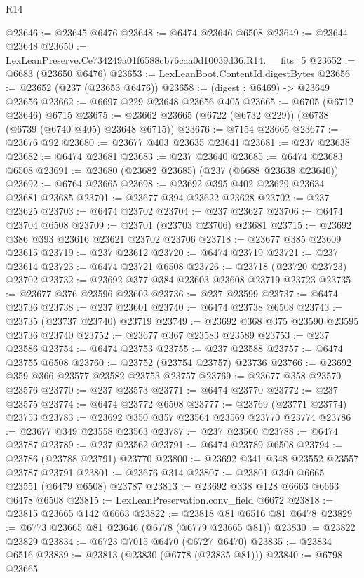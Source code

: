 \begin{lexlean}{R14}
\begin{coremodule}
@23646 := @23645 @6476
@23648 := @6474 @23646 @6508
@23649 := @23644 @23648
@23650 := LexLeanPreserve.Ce734249a01f6588cb76caa0d10039d36.R14.__fits_5
@23652 := @6683 (@23650 @6476)
@23653 := LexLeanBoot.ContentId.digestBytes
@23656 := @23652 (@237 (@23653 @6476))
@23658 := (digest : @6469) -> @23649 @23656
@23662 := @6697 @229 @23648 @23656 @405
@23665 := @6705 (@6712 @23646) @6715
@23675 := @23662 @23665 (@6722 (@6732 @229)) (@6738 (@6739 (@6740 @405) @23648 @6715))
@23676 := @7154 @23665
@23677 := @23676 @92
@23680 := @23677 @403 @23635 @23641
@23681 := @237 @23638
@23682 := @6474 @23681
@23683 := @237 @23640
@23685 := @6474 @23683 @6508
@23691 := @23680 (@23682 @23685) (@237 (@6688 @23638 @23640))
@23692 := @6764 @23665
@23698 := @23692 @395 @402 @23629 @23634 @23681 @23685
@23701 := @23677 @394 @23622 @23628
@23702 := @237 @23625
@23703 := @6474 @23702
@23704 := @237 @23627
@23706 := @6474 @23704 @6508
@23709 := @23701 (@23703 @23706) @23681
@23715 := @23692 @386 @393 @23616 @23621 @23702 @23706
@23718 := @23677 @385 @23609 @23615
@23719 := @237 @23612
@23720 := @6474 @23719
@23721 := @237 @23614
@23723 := @6474 @23721 @6508
@23726 := @23718 (@23720 @23723) @23702
@23732 := @23692 @377 @384 @23603 @23608 @23719 @23723
@23735 := @23677 @376 @23596 @23602
@23736 := @237 @23599
@23737 := @6474 @23736
@23738 := @237 @23601
@23740 := @6474 @23738 @6508
@23743 := @23735 (@23737 @23740) @23719
@23749 := @23692 @368 @375 @23590 @23595 @23736 @23740
@23752 := @23677 @367 @23583 @23589
@23753 := @237 @23586
@23754 := @6474 @23753
@23755 := @237 @23588
@23757 := @6474 @23755 @6508
@23760 := @23752 (@23754 @23757) @23736
@23766 := @23692 @359 @366 @23577 @23582 @23753 @23757
@23769 := @23677 @358 @23570 @23576
@23770 := @237 @23573
@23771 := @6474 @23770
@23772 := @237 @23575
@23774 := @6474 @23772 @6508
@23777 := @23769 (@23771 @23774) @23753
@23783 := @23692 @350 @357 @23564 @23569 @23770 @23774
@23786 := @23677 @349 @23558 @23563
@23787 := @237 @23560
@23788 := @6474 @23787
@23789 := @237 @23562
@23791 := @6474 @23789 @6508
@23794 := @23786 (@23788 @23791) @23770
@23800 := @23692 @341 @348 @23552 @23557 @23787 @23791
@23801 := @23676 @314
@23807 := @23801 @340 @6665 @23551 (@6479 @6508) @23787
@23813 := @23692 @338 @128 @6663 @6663 @6478 @6508
@23815 := LexLeanPreservation.conv_field @6672
@23818 := @23815 @23665 @142 @6663
@23822 := @23818 @81 @6516 @81 @6478
@23829 := @6773 @23665 @81 @23646 (@6778 (@6779 @23665 @81))
@23830 := @23822 @23829
@23834 := @6723 @7015 @6470 (@6727 @6470)
@23835 := @23834 @6516
@23839 := @23813 (@23830 (@6778 (@23835 @81)))
@23840 := @6798 @23665

\end{coremodule}
\end{lexlean}
